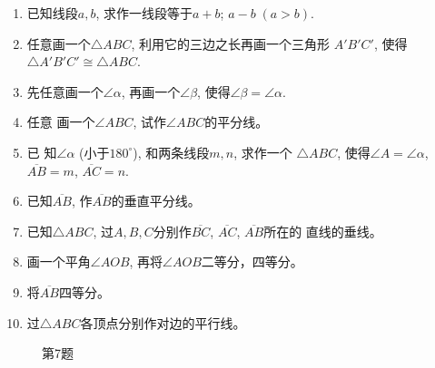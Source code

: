 \begin{ex}
\begin{enumerate}
	\item 已知线段$a,b$, 求作一线段等于$a+b$; $a-b\; (a>b)$.
	\item 任意画一个$\triangle ABC$, 利用它的三边之长再画一个三角形
$A'B'C'$, 使得$\triangle A'B'C'\cong \triangle ABC$.
	\item 先任意画一个$\angle \alpha$, 再画一个$\angle \beta$, 使得$\angle \beta=\angle\alpha$.
	\item 任意
	画一个$\angle ABC$, 试作$\angle ABC$的平分线。
	\item 已
	知$\angle \alpha$ (小于$180^{\circ}$), 和两条线段$m,n$, 求作一个
	$\triangle 
	ABC$, 使得$\angle A=\angle \alpha$, $\overline{AB}=m$, $\overline{AC}=n$.
	\item 已知$\overline{AB}$, 作$\overline{AB}$的垂直平分线。
	\item 已知$\triangle ABC$, 过$A,B,C$分别作$\overline{BC}$, $\overline{AC}$, $\overline{AB}$所在的
	直线的垂线。
	\item 画一个平角$\angle AOB$, 再将$\angle AOB$二等分，四等分。
	\item 将$\overline{AB}$四等分。
	\item 过$\triangle ABC$各顶点分别作对边的平行线。
\end{enumerate}
\end{ex}

\begin{figure}[htp]
	\centering
{}
	\caption*{第7题}
\end{figure}

